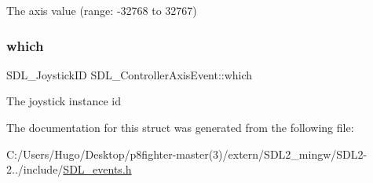 The axis value (range\+: -\/32768 to 32767) \mbox{\label{struct_s_d_l___controller_axis_event_a07087f68ea9d64b50047d65312ee7b94}} 
\subsubsection{\texorpdfstring{which}{which}}
{\footnotesize\ttfamily S\+D\+L\+\_\+\+Joystick\+ID S\+D\+L\+\_\+\+Controller\+Axis\+Event\+::which}

The joystick instance id 

The documentation for this struct was generated from the following file\+:\begin{DoxyCompactItemize}
\item 
C\+:/\+Users/\+Hugo/\+Desktop/p8fighter-\/master(3)/extern/\+S\+D\+L2\+\_\+mingw/\+S\+D\+L2-\/2../include/\hyperlink{_s_d_l__events_8h}{S\+D\+L\+\_\+events.\+h}\end{DoxyCompactItemize}
